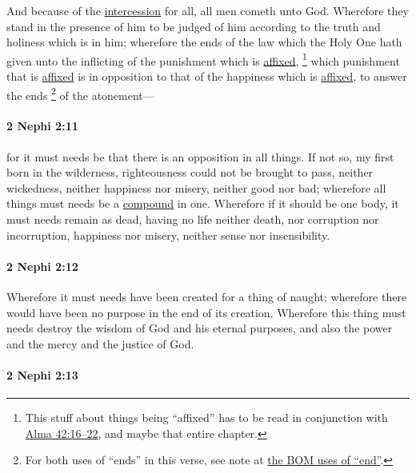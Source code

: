 			And because of the \hyperref[INTERCESSION]{intercession} for all,
			all men cometh unto God.
			Wherefore they stand in the presence of him to be judged of him
			according to the truth and holiness which is in him;
			wherefore the ends of the law which the Holy One hath given
			unto the inflicting of the punishment which is \hyperref[AFFIX-1828]{affixed},%
				\footnote{%
					\label{2NEPHI-2-10-affixed}%
					This stuff about things being ``affixed'' has to be read in conjunction with \hyperref[ALMA-42-16]{Alma 42:16--22}, and maybe that entire chapter.
					}
			which punishment that is \hyperref[AFFIX-1828]{affixed} is in opposition
			to that of the happiness which is \hyperref[AFFIX-1828]{affixed},
			to answer the ends%
				\footnote{%
					\label{2NEPHI-2-10-ends}%
					For both uses of ``ends'' in this verse, see note at \hyperref[END-BOM]{the BOM uses of ``end''}.
					}
			of the atonement---

		\paragraph{2 Nephi 2:11} %
			\label{2NEPHI-2-11}
			
			for it must needs be that there is an opposition in all things.
			If not so, my first born in the wilderness,
			righteousness could not be brought to pass,
			neither wickedness, neither happiness nor misery, neither good nor bad;
			wherefore all things must needs be a \hyperref[COMPOUND-1828]{compound} in one.
			Wherefore if it should be one body,
			it must needs remain as dead,
			having no life neither death, nor corruption nor incorruption,
			happiness nor misery, neither sense nor insensibility.
			
		\paragraph{2 Nephi 2:12} %
			\label{2NEPHI-2-12}
			
			Wherefore it must needs have been created for a thing of naught;
			wherefore there would have been no purpose in the end of its creation.
			Wherefore this thing must needs destroy
			the wisdom of God and his eternal purposes,
			and also the power and the mercy and the justice of God.
			
		\paragraph{2 Nephi 2:13} %
			\label{2NEPHI-2-13}
			
